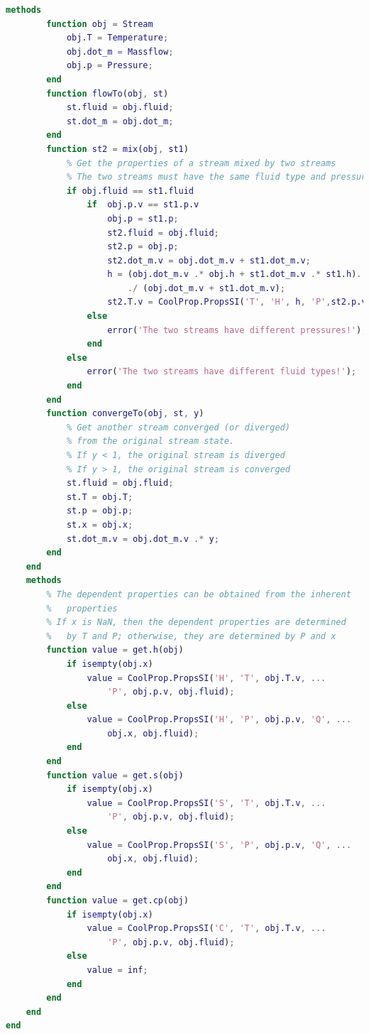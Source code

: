 \begin{lstlisting}[language= MATLAB, backgroundcolor = \color{yellow!20}, label = {lst:MATLAB_SOURCECODE}]
    methods
        function obj = Stream
            obj.T = Temperature;
            obj.dot_m = Massflow;
            obj.p = Pressure;
        end
        function flowTo(obj, st)
            st.fluid = obj.fluid;
            st.dot_m = obj.dot_m;
        end
        function st2 = mix(obj, st1)
            % Get the properties of a stream mixed by two streams
            % The two streams must have the same fluid type and pressure
            if obj.fluid == st1.fluid
                if  obj.p.v == st1.p.v
                    obj.p = st1.p;
                    st2.fluid = obj.fluid;
                    st2.p = obj.p;
                    st2.dot_m.v = obj.dot_m.v + st1.dot_m.v;
                    h = (obj.dot_m.v .* obj.h + st1.dot_m.v .* st1.h)...
                        ./ (obj.dot_m.v + st1.dot_m.v);
                    st2.T.v = CoolProp.PropsSI('T', 'H', h, 'P',st2.p.v);
                else
                    error('The two streams have different pressures!');
                end
            else
                error('The two streams have different fluid types!');
            end
        end
        function convergeTo(obj, st, y)
            % Get another stream converged (or diverged)
            % from the original stream state.
            % If y < 1, the original stream is diverged
            % If y > 1, the original stream is converged
            st.fluid = obj.fluid;
            st.T = obj.T;
            st.p = obj.p;
            st.x = obj.x;
            st.dot_m.v = obj.dot_m.v .* y;
        end
    end
    methods
        % The dependent properties can be obtained from the inherent
        %   properties
        % If x is NaN, then the dependent properties are determined
        %   by T and P; otherwise, they are determined by P and x
        function value = get.h(obj)
            if isempty(obj.x)
                value = CoolProp.PropsSI('H', 'T', obj.T.v, ...
                    'P', obj.p.v, obj.fluid);
            else
                value = CoolProp.PropsSI('H', 'P', obj.p.v, 'Q', ...
                    obj.x, obj.fluid);
            end
        end
        function value = get.s(obj)
            if isempty(obj.x)
                value = CoolProp.PropsSI('S', 'T', obj.T.v, ...
                    'P', obj.p.v, obj.fluid);
            else
                value = CoolProp.PropsSI('S', 'P', obj.p.v, 'Q', ...
                    obj.x, obj.fluid);
            end
        end
        function value = get.cp(obj)
            if isempty(obj.x)
                value = CoolProp.PropsSI('C', 'T', obj.T.v, ...
                    'P', obj.p.v, obj.fluid);
            else
                value = inf;
            end
        end
    end
end
\end{lstlisting}
